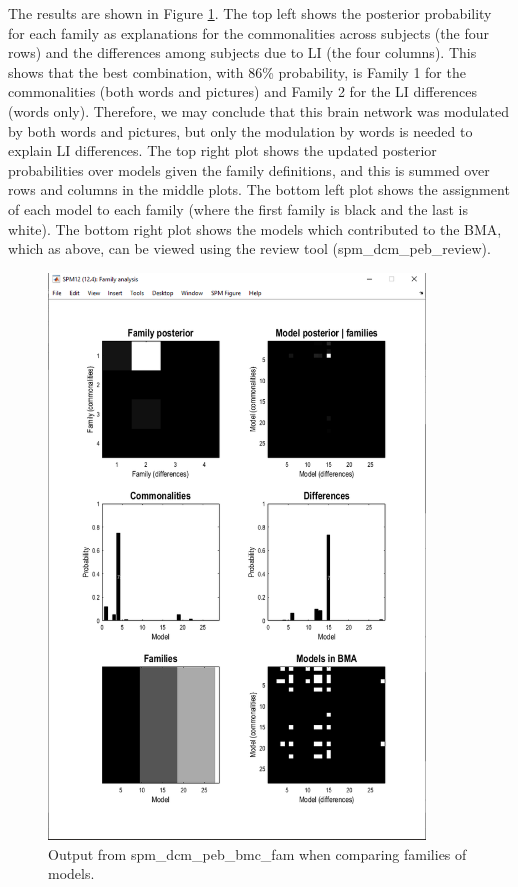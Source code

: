 \documentclass{article}
\begin{document}
The results are shown in Figure \ref{Fig_peb_family_analysis}. The top left shows the posterior probability for each family as explanations for the commonalities across subjects (the four rows) and the differences among subjects due to LI (the four columns). This shows that the best combination, with 86\% probability, is Family 1 for the commonalities (both words and pictures) and Family 2 for the LI differences (words only). Therefore, we may conclude that this brain network was modulated by both words and pictures, but only the modulation by words is needed to explain LI differences. The top right plot shows the updated posterior probabilities over models given the family definitions, and this is summed over rows and columns in the middle plots. The bottom left plot shows the assignment of each model to each family (where the first family is black and the last is white). The bottom right plot shows the models which contributed to the BMA, which as above, can be viewed using the review tool (spm\_dcm\_peb\_review).

\begin{figure}[ht]
\begin{center}
\includegraphics[width=10cm]{"Fig_peb_family_analysis"}
\caption{Output from spm\_dcm\_peb\_bmc\_fam when comparing families of models.\label{Fig_peb_family_analysis}}
\end{center}
\end{figure}
\end{document}

